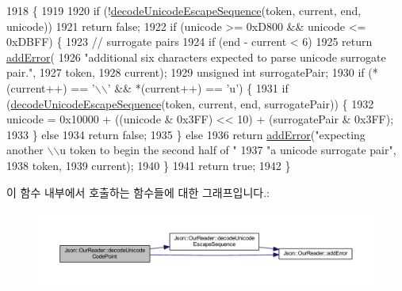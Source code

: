 \begin{DoxyCode}
1918                                                            \{
1919 
1920   \textcolor{keywordflow}{if} (!\hyperlink{class_json_1_1_our_reader_adb39be814cc6076b91a0919bdd5b24b0}{decodeUnicodeEscapeSequence}(token, current, end, unicode))
1921     \textcolor{keywordflow}{return} \textcolor{keyword}{false};
1922   \textcolor{keywordflow}{if} (unicode >= 0xD800 && unicode <= 0xDBFF) \{
1923     \textcolor{comment}{// surrogate pairs}
1924     \textcolor{keywordflow}{if} (end - current < 6)
1925       \textcolor{keywordflow}{return} \hyperlink{class_json_1_1_our_reader_aa6a920311e6408ff3a45324d49da18a6}{addError}(
1926           \textcolor{stringliteral}{"additional six characters expected to parse unicode surrogate pair."},
1927           token,
1928           current);
1929     \textcolor{keywordtype}{unsigned} \textcolor{keywordtype}{int} surrogatePair;
1930     \textcolor{keywordflow}{if} (*(current++) == \textcolor{charliteral}{'\(\backslash\)\(\backslash\)'} && *(current++) == \textcolor{charliteral}{'u'}) \{
1931       \textcolor{keywordflow}{if} (\hyperlink{class_json_1_1_our_reader_adb39be814cc6076b91a0919bdd5b24b0}{decodeUnicodeEscapeSequence}(token, current, end, surrogatePair)) \{
1932         unicode = 0x10000 + ((unicode & 0x3FF) << 10) + (surrogatePair & 0x3FF);
1933       \} \textcolor{keywordflow}{else}
1934         \textcolor{keywordflow}{return} \textcolor{keyword}{false};
1935     \} \textcolor{keywordflow}{else}
1936       \textcolor{keywordflow}{return} \hyperlink{class_json_1_1_our_reader_aa6a920311e6408ff3a45324d49da18a6}{addError}(\textcolor{stringliteral}{"expecting another \(\backslash\)\(\backslash\)u token to begin the second half of "}
1937                       \textcolor{stringliteral}{"a unicode surrogate pair"},
1938                       token,
1939                       current);
1940   \}
1941   \textcolor{keywordflow}{return} \textcolor{keyword}{true};
1942 \}
\end{DoxyCode}
이 함수 내부에서 호출하는 함수들에 대한 그래프입니다.\+:\nopagebreak
\begin{figure}[H]
\begin{center}
\leavevmode
\includegraphics[width=350pt]{class_json_1_1_our_reader_ac1bf03c161ece082e48da450c50f528d_cgraph}
\end{center}
\end{figure}

